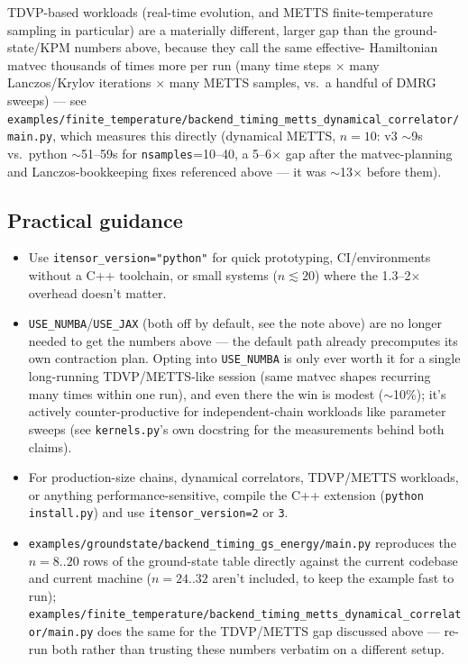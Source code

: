 \documentclass[11pt]{article}
\begin{document}
TDVP-based workloads (real-time evolution, and METTS finite-temperature
sampling in particular) are a materially different, larger gap than the
ground-state/KPM numbers above, because they call the same effective-
Hamiltonian matvec thousands of times more per run (many time steps
$\times$ many Lanczos/Krylov iterations $\times$ many METTS samples, vs.\
a handful of DMRG sweeps) --- see
\texttt{examples/finite\_temperature/backend\_timing\_metts\_dynamical\_correlator/main.py},
which measures this directly (dynamical METTS, $n=10$: v3 $\sim$9s vs.\
python $\sim$51--59s for \texttt{nsamples}=10--40, a 5--6$\times$ gap
after the matvec-planning and Lanczos-bookkeeping fixes referenced above
--- it was $\sim$13$\times$ before them).

\subsection{Practical guidance}

\begin{itemize}
  \item Use \texttt{itensor\_version="python"} for quick prototyping,
    CI/environments without a C++ toolchain, or small systems ($n
    \lesssim 20$) where the 1.3--2$\times$ overhead doesn't matter.
  \item \texttt{USE\_NUMBA}/\texttt{USE\_JAX} (both off by default, see
    the note above) are no longer needed to get the numbers above ---
    the default path already precomputes its own contraction plan.
    Opting into \texttt{USE\_NUMBA} is only ever worth it for a single
    long-running TDVP/METTS-like session (same matvec shapes recurring
    many times within one run), and even there the win is modest
    ($\sim$10\%); it's actively counter-productive for independent-chain
    workloads like parameter sweeps (see \texttt{kernels.py}'s own
    docstring for the measurements behind both claims).
  \item For production-size chains, dynamical correlators, TDVP/METTS
    workloads, or anything performance-sensitive, compile the C++
    extension (\texttt{python install.py}) and use
    \texttt{itensor\_version=2} or \texttt{3}.
  \item \texttt{examples/groundstate/backend\_timing\_gs\_energy/main.py} reproduces
    the $n=8..20$ rows of the ground-state table directly against the
    current codebase and current machine ($n=24..32$ aren't included, to
    keep the example fast to run); \texttt{examples/finite\_temperature/backend\_timing\_metts\_dynamical\_correlator/main.py}
    does the same for the TDVP/METTS gap discussed above --- re-run both
    rather than trusting these numbers verbatim on a different setup.
\end{itemize}
\end{document}
